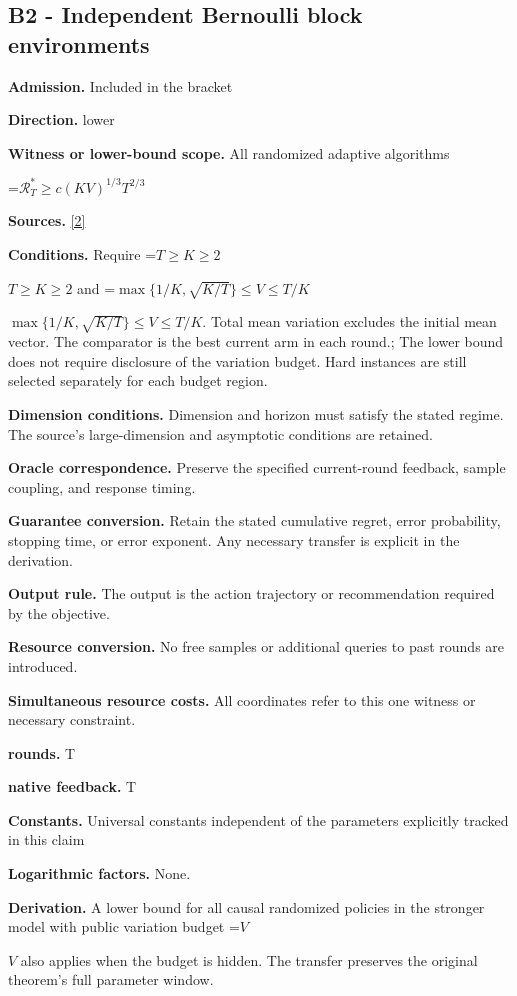 \documentclass[10pt,a4paper]{article}
\newcommand{\AtlasMath}[1]{\par\begingroup\centering\setbox0=\hbox{$\displaystyle #1$}\ifdim\wd0>1.4\linewidth\typeout{ATLAS WIDE FORMULA: \the\wd0}\fi\ifdim\wd0>\linewidth\resizebox{\linewidth}{!}{\box0}\else\box0\fi\par\endgroup}
\newcommand{\AtlasInlineMath}[1]{\begingroup\setbox0=\hbox{$#1$}\ifdim\wd0>.4\linewidth\endgroup\AtlasMath{#1}\else\endgroup$#1$\fi}
\begin{document}
\subsection{B2 - Independent Bernoulli block environments}
\textbf{Admission.} Included in the bracket

\textbf{Direction.} lower

\textbf{Witness or lower-bound scope.} All randomized adaptive algorithms

\AtlasMath{\mathcal{R}_T^*\ge c(KV)^{1/3}T^{2/3}}
\textbf{Sources.} \href{https://arxiv.org/pdf/1405.3316v2}{[2]}

\textbf{Conditions.} Require \AtlasInlineMath{T\ge K\ge2} and \AtlasInlineMath{\max\{1/K,\sqrt{K/T}\}\le V\le T/K}. Total mean variation excludes the initial mean vector. The comparator is the best current arm in each round.; The lower bound does not require disclosure of the variation budget. Hard instances are still selected separately for each budget region.

\textbf{Dimension conditions.} Dimension and horizon must satisfy the stated regime. The source's large-dimension and asymptotic conditions are retained.

\textbf{Oracle correspondence.} Preserve the specified current-round feedback, sample coupling, and response timing.

\textbf{Guarantee conversion.} Retain the stated cumulative regret, error probability, stopping time, or error exponent. Any necessary transfer is explicit in the derivation.

\textbf{Output rule.} The output is the action trajectory or recommendation required by the objective.

\textbf{Resource conversion.} No free samples or additional queries to past rounds are introduced.

\textbf{Simultaneous resource costs.} All coordinates refer to this one witness or necessary constraint.

\textbf{rounds.} T

\textbf{native feedback.} T

\textbf{Constants.} Universal constants independent of the parameters explicitly tracked in this claim

\textbf{Logarithmic factors.} None.

\textbf{Derivation.} A lower bound for all causal randomized policies in the stronger model with public variation budget \AtlasInlineMath{V} also applies when the budget is hidden. The transfer preserves the original theorem's full parameter window.
\end{document}
